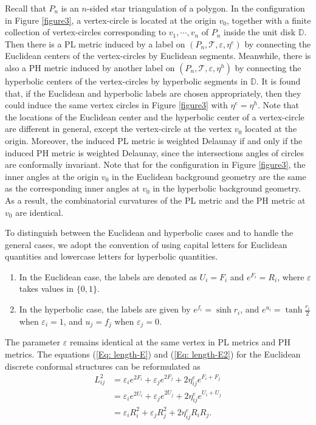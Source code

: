 \documentclass[12pt]{amsart}
\theoremstyle{definition}
\begin{document}
Recall that $P_n$ is an $n$-sided star triangulation of a polygon. In the configuration in Figure \ref{figure3}, a vertex-circle is located at the origin $v_0$, together with a finite collection of vertex-circles corresponding to $v_1, \cdots, v_n$ of $P_n$ inside the unit disk $\mathbb{D}$. Then there is a PL metric induced by a label on $(P_n, \mathcal{T}, \varepsilon, \eta^e)$ by connecting the Euclidean centers of the vertex-circles by Euclidean segments. 
Meanwhile, there is also a PH metric induced by another label on $(P_n, \mathcal{T}, \varepsilon, \eta^h)$ by connecting the hyperbolic centers of the vertex-circles by hyperbolic segments in $\mathbb{D}$. 
It is found that, if the Euclidean and hyperbolic labels are chosen appropriately, then they could induce the same vertex circles in Figure \ref{figure3} with $\eta^e=\eta^h$.
Note that the locations of the Euclidean center and the hyperbolic center of a vertex-circle are different in general, except the vertex-circle at the vertex $v_0$ located at the origin. 
Moreover,  the induced PL metric is weighted Delaunay if and only if the induced PH metric is weighted Delaunay, 
since the intersections angles of circles are conformally invariant. 
Note that for the configuration in Figure \ref{figure3}, the inner angles at the origin $v_0$ in the Euclidean background geometry are the same
as the corresponding inner angles at $v_0$ in the hyperbolic background geometry. As a result, the combinatorial curvatures of the PL metric and the PH metric at $v_0$ are identical. 

To distinguish between the Euclidean and hyperbolic cases and to handle the general cases, we adopt the convention of using capital letters for Euclidean quantities and lowercase letters for hyperbolic quantities.
\begin{enumerate}
    \item In the Euclidean case, the labels are denoted as $U_i=F_i$ and $e^{F_i}=R_i$, where $\varepsilon$ takes values in $\{0,1\}$.
    \item In the hyperbolic case, the labels are given by $e^{f_i}=\sinh r_i$, and $e^{u_i}=\tanh\frac{r_i}{2}$ when $\varepsilon_i=1$, and $u_j=f_j$ when $\varepsilon_j=0$.
\end{enumerate}
The parameter $\varepsilon$ remains identical at the same vertex in PL metrics and PH metrics.
The equations (\ref{Eq: length-E}) and (\ref{Eq: length-E2}) for the Euclidean discrete conformal structures can be reformulated as 
\begin{equation}\label{Eq: length-E3}
\begin{aligned}
L^2_{ij}
&=\varepsilon_ie^{2F_i}+\varepsilon_je^{2F_j}
+2\eta^e_{ij}e^{F_i+F_j}\\
&=\varepsilon_ie^{2U_i}+\varepsilon_je^{2U_j}
+2\eta^e_{ij}e^{U_i+U_j}\\
&=\varepsilon_iR_i^2+\varepsilon_jR_j^2+2\eta^e_{ij}R_iR_j.
\end{aligned}
\end{equation}
\end{document}
